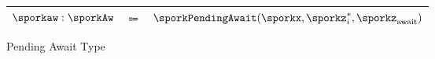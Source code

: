 \begin{figure}[h!]
\sporkGrammarStuff
\begin{tabular}{rrl}
\toprule
  $\sporkaw : \sporkAw$ & $\Coloneqq$ &
        $\sporkPendingAwait(\sporkx, \sporkz^*_i, \sporkz_\mathrm{await})$ \\
\bottomrule
\end{tabular}
\caption{Pending Await Type}
\label{fig:PendingAwait}
\end{figure}
